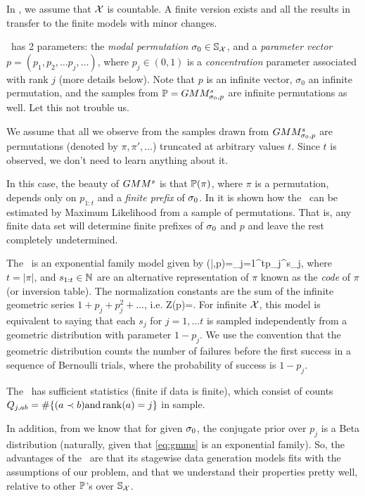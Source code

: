 \documentclass[10pt]{article}
\begin{document}
\benum
\item In \gmms, we assume that ${\mathcal X}$ is countable. A finite version exists and all the results in \cite{MBao} transfer to the finite models with minor changes.
\item \gmms~has 2 parameters: the {\em modal permutation} $\sigma_0\in
  {\mathbb S}_{{\mathcal X}}$, and a {\em parameter vector} 
  $p=(p_1,p_2,\ldots p_j,\ldots)$, where
  $p_j\in (0,1)$ is a {\em concentration} parameter associated
  with rank $j$ (more details below). Note that $p$ is an
  infinite vector, $\sigma_0$ an infinite permutation, and the samples
  from ${\mathbb P}=GMM^s_{\sigma_0,p}$ are infinite permutations as
  well. Let this not trouble us.
\item We assume that all we observe from the samples drawn from $GMM^s_{\sigma_0,p}$ are \topt permutations (denoted by $\pi,\pi',\ldots$) truncated at arbitrary values $t$. Since $t$ is observed, we don't need to learn anything about it.
\item
  In this case, the beauty of $GMM^s$ is that ${\mathbb P}(\pi)$, where $\pi$ is a \topt permutation, depends only on $p_{1:t}$ and a {\em finite prefix} of $\sigma_0$. In \cite{MBao} it is shown how the \gmms~can be estimated by Maximum Likelihood from a sample of \topt permutations. That is, any finite data set will determine finite prefixes of $\sigma_0$ and $p$ and leave the rest completely undetermined.
\item The \gmms~is an exponential family model given by
  \beq
\gmms(\pi|\sigzero,p)\;=\;\prod_{j=1}^tp_j^{s_j},
\eeq
%
where $t=|\pi|$, and $s_{1:t}\in{\mathbb N}$ are an alternative representation of $\pi$ known as the {\em code} of $\pi$ \cite{Stanley} (or inversion table). The normalization constants are the sum of the infinite geometric series $1+p_j+p_j^2+\ldots$, i.e.
\beq
Z(p)\;=\;.
\eeq
For infinite ${\mathcal X}$, this model is equivalent to saying that each $s_j$ for $j=1 ,\ldots t$ is sampled independently from a geometric distribution with parameter $1-p_j$. We use the convention that the geometric distribution counts the number of failures before the first success in a sequence of Bernoulli trials, where the probability of success is $1-p_j$.
\item The \gmms~has sufficient statistics (finite if data is finite), which consist of counts $Q_{j,ab}=\#\{(a\prec b) \text{and} \operatorname{rank}(a)=j\}$ in sample.
\item In addition, from \cite{MBao} we know that for given $\sigma_0$, the conjugate prior over $p_j$ is a Beta distribution (naturally, given that \eqref{eq:gmms} is an exponential family). 
\eenum
So, the advantages of the \gmms~are that its stagewise data generation models fits with the assumptions of our problem, and that we understand their properties pretty well, relative to other ${\mathbb P}$'s over ${\mathbb S}_{{\mathcal X}}$.
\end{document}
